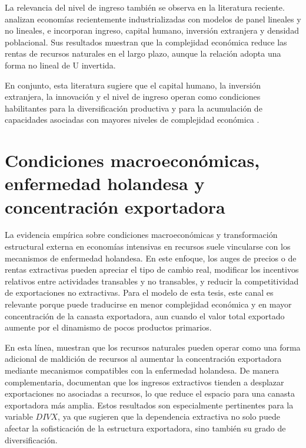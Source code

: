 \documentclass[../../TFM.tex]{subfiles}
\begin{document}
	La relevancia del nivel de ingreso también se observa en la literatura reciente. \textcite{Li2024} analizan economías recientemente industrializadas con modelos de panel lineales y no lineales, e incorporan ingreso, capital humano, inversión extranjera y densidad poblacional. Sus resultados muestran que la complejidad económica reduce las rentas de recursos naturales en el largo plazo, aunque la relación adopta una forma no lineal de U invertida.
	
	En conjunto, esta literatura sugiere que el capital humano, la inversión extranjera, la innovación y el nivel de ingreso operan como condiciones habilitantes para la diversificación productiva y para la acumulación de capacidades asociadas con mayores niveles de complejidad económica \parencite{YaseminYalta2021,Khan2020,Alvarado2023,Li2024}.

	\section{Condiciones macroeconómicas, enfermedad holandesa y concentración exportadora}
	\label{sec:condiciones-macroeconomicas-dutch-disease}
	
	La evidencia empírica sobre condiciones macroeconómicas y transformación estructural externa en economías intensivas en recursos suele vincularse con los mecanismos de enfermedad holandesa. En este enfoque, los auges de precios o de rentas extractivas pueden apreciar el tipo de cambio real, modificar los incentivos relativos entre actividades transables y no transables, y reducir la competitividad de exportaciones no extractivas. Para el modelo de esta tesis, este canal es relevante porque puede traducirse en menor complejidad económica y en mayor concentración de la canasta exportadora, aun cuando el valor total exportado aumente por el dinamismo de pocos productos primarios.

	En esta línea, \textcite{Bahar2018} muestran que los recursos naturales pueden operar como una forma adicional de maldición de recursos al aumentar la concentración exportadora mediante mecanismos compatibles con la enfermedad holandesa. De manera complementaria, \textcite{Harding2016} documentan que los ingresos extractivos tienden a desplazar exportaciones no asociadas a recursos, lo que reduce el espacio para una canasta exportadora más amplia. Estos resultados son especialmente pertinentes para la variable $DIVX$, ya que sugieren que la dependencia extractiva no solo puede afectar la sofisticación de la estructura exportadora, sino también su grado de diversificación.
\end{document}
